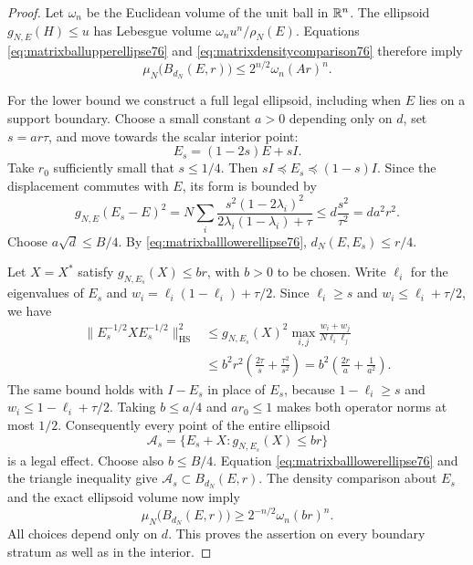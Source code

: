 \begin{proof}
Let $\omega_n$ be the Euclidean volume of the unit ball in $\mathbb R^n$.
The ellipsoid $g_{N,E}(H)\le u$ has Lebesgue volume
$\omega_nu^n/\rho_N(E)$. Equations
\eqref{eq:matrixballupperellipse76} and
\eqref{eq:matrixdensitycomparison76} therefore imply
\[
 \mu_N\bigl(B_{d_N}(E,r)\bigr)
                  \le2^{n/2}\omega_n(Ar)^n.
\]

For the lower bound we construct a full legal ellipsoid, including
when $E$ lies on a support boundary. Choose a small constant $a>0$
depending only on $d$, set $s=ar\tau$, and move towards the scalar
interior point:
\begin{equation}\label{eq:matrixinwardshift76}
 E_s=(1-2s)E+sI.
\end{equation}
Take $r_0$ sufficiently small that $s\le1/4$. Then
$sI\preceq E_s\preceq(1-s)I$. Since the displacement commutes with
$E$, its form is bounded by
\[
 g_{N,E}(E_s-E)^2
 =N\sum_i\frac{s^2(1-2\lambda_i)^2}
                    {2\lambda_i(1-\lambda_i)+\tau}
 \le d\frac{s^2}{\tau^2}=da^2r^2.
\]
Choose $a\sqrt d\le B/4$. By
\eqref{eq:matrixballlowerellipse76},
$d_N(E,E_s)\le r/4$.

Let $X=X^*$ satisfy $g_{N,E_s}(X)\le br$, with $b>0$ to be chosen.
Write $\ell_i$ for the eigenvalues of $E_s$ and
$w_i=\ell_i(1-\ell_i)+\tau/2$. Since $\ell_i\ge s$ and
$w_i\le\ell_i+\tau/2$, we have
\begin{align*}
 \|E_s^{-1/2}XE_s^{-1/2}\|_{\mathrm{HS}}^2
 &\le g_{N,E_s}(X)^2
       \max_{i,j}\frac{w_i+w_j}{N\ell_i\ell_j}\\
 &\le b^2r^2\left(\frac{2\tau}{s}
                         +\frac{\tau^2}{s^2}\right)
   =b^2\left(\frac{2r}{a}+\frac1{a^2}\right).
\end{align*}
The same bound holds with $I-E_s$ in place of $E_s$, because
$1-\ell_i\ge s$ and $w_i\le1-\ell_i+\tau/2$. Taking
$b\le a/4$ and $ar_0\le1$ makes both operator norms at most $1/2$.
Consequently every point of the entire ellipsoid
\[
 \mathcal A_s=\{E_s+X:g_{N,E_s}(X)\le br\}
\]
is a legal effect. Choose also $b\le B/4$. Equation
\eqref{eq:matrixballlowerellipse76} and the triangle inequality give
$\mathcal A_s\subset B_{d_N}(E,r)$. The density comparison about
$E_s$ and the exact ellipsoid volume now imply
\[
 \mu_N\bigl(B_{d_N}(E,r)\bigr)
           \ge2^{-n/2}\omega_n(br)^n.
\]
All choices depend only on $d$. This proves the assertion on every
boundary stratum as well as in the interior.
\end{proof}


